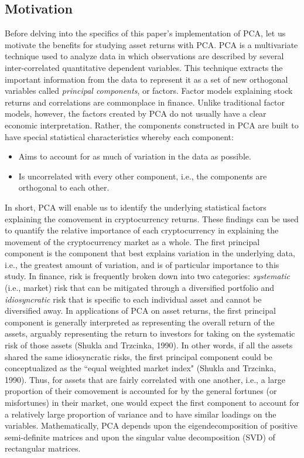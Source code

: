 \documentclass[12pt,twoside]{article}
\begin{document}
\subsection{Motivation}

Before delving into the specifics of this paper's implementation of PCA, let us motivate the benefits for studying asset returns with PCA. PCA is a multivariate technique used to analyze data in which observations are described by several inter-correlated quantitative dependent variables. This technique extracts the important information from the data to represent it as a set of new orthogonal variables called \textit{principal components}, or factors.
\bigbreak
Factor models explaining stock returns and correlations are commonplace in finance. Unlike traditional factor models, however, the factors created by PCA do not usually have a clear economic interpretation. Rather, the components constructed in PCA are built to have special statistical characteristics whereby each component: 
\begin{itemize}
	\item Aims to account for as much of variation in the data as possible.
	\item Is uncorrelated with every other component, i.e., the components are orthogonal to each other.
\end{itemize}

In short, PCA will enable us to identify the underlying statistical factors explaining the comovement in cryptocurrency returns. These findings can be used to quantify the relative importance of each cryptocurrency in explaining the movement of the cryptocurrency market as a whole.
\bigbreak
The first principal component is the component that best explains variation in the underlying data, i.e., the greatest amount of variation, and is of particular importance to this study. In finance, risk is frequently broken down into two categories: \textit{systematic} (i.e., market) risk that can be mitigated through a diversified portfolio and \textit{idiosyncratic} risk that is specific to each individual asset and cannot be diversified away. In applications of PCA on asset returns, the first principal component is generally interpreted as representing the overall return of the assets, arguably representing the return to investors for taking on the systematic risk of those assets (Shukla and Trzcinka, 1990). In other words, if all the assets shared the same idiosyncratic risks, the first principal component could be conceptualized as the ``equal weighted market index" (Shukla and Trzcinka, 1990). Thus, for assets that are fairly correlated with one another, i.e., a large proportion of their comovement is accounted for by the general fortunes (or misfortunes) in their market, one would expect the first component to account for a relatively large proportion of variance and to have similar loadings on the variables. Mathematically, PCA depends upon the eigendecomposition of positive semi-definite matrices and upon the singular value decomposition (SVD) of rectangular matrices.
\end{document}
